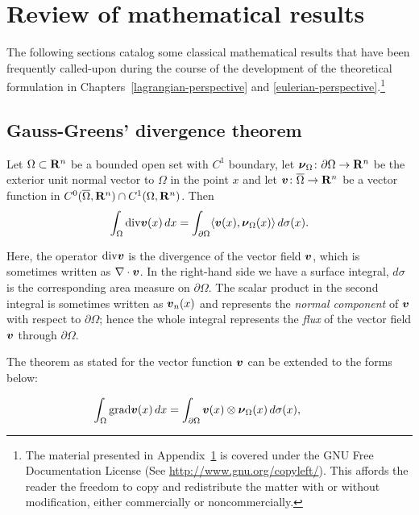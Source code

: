 \chapter{Review of mathematical results}
\label{additional-proofs}

The following sections catalog some classical mathematical results
that have been frequently called-upon during the course of the
development of the theoretical formulation in
Chapters~\ref{lagrangian-perspective} and
\ref{eulerian-perspective}.\footnote{The material presented in
  Appendix~\ref{additional-proofs} is covered under the GNU Free
  Documentation License (See \href{http://www.gnu.org/copyleft/}
  {http://www.gnu.org/copyleft/}). This affords the reader the freedom
  to copy and redistribute the matter with or without modification,
  either commercially or noncommercially.}

\section{Gauss-Greens' divergence theorem}
\label{gauss-divergence}

Let $\Omega\subset \mathbf R^n$ be a bounded open set with $C^1$ boundary,
let $\mbox{\boldmath$\nu$}_\Omega\colon \partial \Omega\to \mathbf R^n$ be the exterior unit
normal vector to $\Omega$ in the point $x$ and let $\mbox{\boldmath$ v$}\colon
\overline{\Omega}\to \mathbf R^n$ be a vector function in
$C^0(\overline\Omega,\mathbf R^n)\cap C^1(\Omega,\mathbf R^n)$. Then
\[
\int_\Omega \mathrm{div} \mbox{\boldmath$ v$}(x)\, dx =\int_{\partial \Omega} \langle
\mbox{\boldmath$ v$}(x),\mbox{\boldmath$\nu$}_\Omega(x)\rangle \, d\sigma(x).
\]

Here, the operator $\mathrm{div} \mbox{\boldmath$ v$}$ is the
divergence of the vector field $\mbox{\boldmath$ v$}$, which is sometimes written as
$\nabla \cdot \mbox{\boldmath$ v$}$.  In the right-hand side we have a surface integral,
$d\sigma$ is the corresponding area measure on $\partial \Omega$.  The
scalar product in the second integral is sometimes written as $\mbox{\boldmath$ v$}_n(x)$
and represents the \emph{normal component} of $\mbox{\boldmath$ v$}$ with respect to
$\partial \Omega$; hence the whole integral represents the \emph{flux}
of the vector field $\mbox{\boldmath$ v$}$ through $\partial \Omega$.

The theorem as stated for the vector function $\mbox{\boldmath$ v$}$ can be extended to
the forms below:

\begin{equation*}
\int_\Omega \mathrm{grad} \bv(x)\, dx =\int_{\partial \Omega} 
\bv(x)\otimes \Bnu_\Omega(x) \, d\sigma(x),\ \phantom{\mathrm{and}}
\end{equation*}

